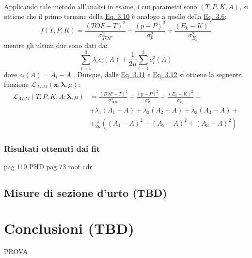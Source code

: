 \documentclass[12pt,a4paper,twoside]{report}
\newcommand{\vect}[1]{\boldsymbol{#1}}
\begin{document}
	Applicando tale metodo all'analisi in esame, i cui parametri sono $\left(T,P,K,A\right)$, si ottiene che il primo termine della \hyperref[eq:augmented_lagrangian_funct]{Eq. 3.10} è analogo a quello della \hyperref[eq:chi_square]{Eq. 3.6}:
	\begin{equation}
		f\left(T,P,K\right)=\frac{\left(TOF-T\right)^2}{\sigma^2_{TOF}}+\frac{\left(p-P\right)^2}{\sigma^2_{p}}+\frac{\left(E_k-K\right)^2}{\sigma^2_{E_k}}
		\label{eq:first_term_ALM}
	\end{equation}
	mentre gli ultimi due sono dati da:
	\begin{equation}
		\sum_{i=1}^{3}\lambda_ic_i\left(A\right)+\frac{1}{2\mu}\sum_{i=1}^{3}c_i^2\left(A\right)
		\label{eq:other_terms_ALM}
	\end{equation}
	dove $c_i\left(A\right)=A_i-A$ \cite{valle2019design}. Dunque, dalle \hyperref[eq:first_term_ALM]{Eq. 3.11} e \hyperref[eq:other_terms_ALM]{Eq. 3.12} si ottiene la seguente funzione $\mathcal{L}_{ALM}\left(\vect{x};\vect{\lambda},\mu\right)$:
	\begin{equation}
		\begin{aligned}
			\mathcal{L}_{ALM}\left(T,P,K,A;\vect{\lambda},\mu\right)&=\frac{\left(TOF-T\right)^2}{\sigma^2_{TOF}}+\frac{\left(p-P\right)^2}{\sigma^2_{p}}+\frac{\left(E_k-K\right)^2}{\sigma^2_{E_k}}+\\
			&+\lambda_1\left(A_1-A\right)+\lambda_2\left(A_2-A\right)+\lambda_3\left(A_3-A\right)+\\
			&+\frac{1}{2\mu}\left(\left(A_1-A\right)^2+\left(A_2-A\right)^2+\left(A_3-A\right)^2\right)
		\end{aligned}
		\label{eq:alm_analysis}
	\end{equation}
	
	\subsection{Risultati ottenuti dai fit}
	pag 110 PHD
	pag 73 root cdr
	
	\section{Misure di sezione d'urto (TBD)}
				
	\chapter*{Conclusioni (TBD)}
		PROVA
	\newpage	
	\printbibliography[
		heading=bibintoc,
		title={Bibliografia}
		]
		
\end{document}
